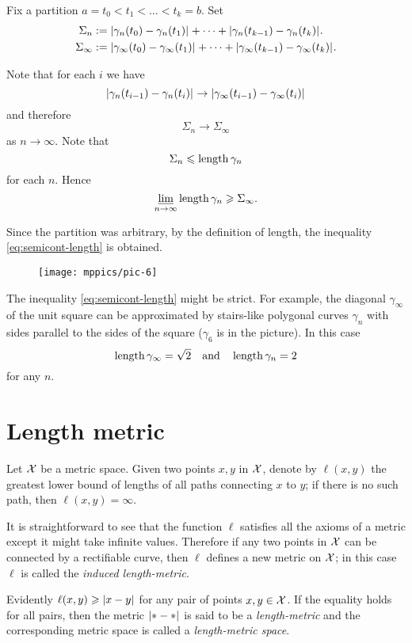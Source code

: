 Fix a partition $a=t_0<t_1<\dots<t_k=b$.
Set 
\begin{align*}\Sigma_n
&\df
\dist{\gamma_n(t_0)}{\gamma_n(t_1)}{}
+\dots+
\dist{\gamma_n(t_{k-1})}{\gamma_n(t_k)}{}.
\\
\Sigma_\infty
&\df
\dist{\gamma_\infty(t_0)}{\gamma_\infty(t_1)}{}
+\dots+
\dist{\gamma_\infty(t_{k-1})}{\gamma_\infty(t_k)}{}.
\end{align*}

Note that for each $i$ we have 
\[\dist{\gamma_n(t_{i-1})}{\gamma_n(t_i)}{}
\to
\dist{\gamma_\infty(t_{i-1})}{\gamma_\infty(t_i)}{}\]
and therefore
\[\Sigma_n\to \Sigma_\infty\] 
as $n\to\infty$.
Note that 
\[\Sigma_n\leqslant\mathop{\rm length}\nolimits\gamma_n\]
for each $n$.
Hence
$$\varliminf_{n\to\infty} \mathop{\rm length}\nolimits\gamma_n \geqslant \Sigma_\infty.$$

  
Since the partition was arbitrary, by the definition of length, the inequality  \ref{eq:semicont-length} is obtained.
\qeds


\begin{wrapfigure}{o}{20 mm}
\vskip3mm
\centering
\texttt{[image: mppics/pic-6]}
\end{wrapfigure}


The inequality \ref{eq:semicont-length} might be strict.
For example, the diagonal $\gamma_\infty$ of the unit square 
can be approximated by stairs-like polygonal curves $\gamma_n$
with sides parallel to the sides of the square ($\gamma_6$ is in the picture).
In this case
\[\mathop{\rm length}\nolimits\gamma_\infty=\sqrt{2}\quad
\text{and}\quad \mathop{\rm length}\nolimits\gamma_n=2\]
for any $n$.



\section{Length metric}\label{sec:Length metric}

Let $\mathcal{X}$ be a metric space.
Given two points $x,y$ in $\mathcal{X}$, denote by $\ell(x,y)$ the greatest lower bound of lengths of all paths connecting $x$ to $y$; if there is no such path, then $\ell(x,y)=\infty$.

It is straightforward to see that the function $\ell$ satisfies all the axioms of a metric except it might take infinite values.
Therefore if any two points in $\mathcal{X}$ can be connected by a rectifiable curve, then $\ell$ defines a new metric on $\mathcal{X}$;
in this case $\ell$ is called the \emph{induced length-metric}.

Evidently $\ell(x,y)\ge \dist{x}{y}{}$ for any pair of points $x,y\in \mathcal{X}$.
If the equality holds for all pairs, then the metric $\dist{{*}}{{*}}{}$ is said to be a \emph{length-metric} and the corresponding metric space is called a \index{}\emph{length-metric space}.

